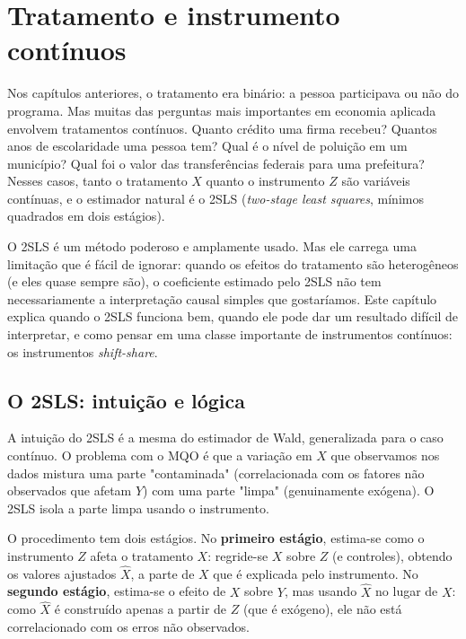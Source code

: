 
\chapter{Tratamento e instrumento contínuos}
\label{cap:iv_continuo}

Nos capítulos anteriores, o tratamento era binário: a pessoa participava ou não do programa. Mas muitas das perguntas mais importantes em economia aplicada envolvem tratamentos contínuos. Quanto crédito uma firma recebeu? Quantos anos de escolaridade uma pessoa tem? Qual é o nível de poluição em um município? Qual foi o valor das transferências federais para uma prefeitura? Nesses casos, tanto o tratamento $X$ quanto o instrumento $Z$ são variáveis contínuas, e o estimador natural é o 2SLS (\textit{two-stage least squares}, mínimos quadrados em dois estágios).

O 2SLS é um método poderoso e amplamente usado. Mas ele carrega uma limitação que é fácil de ignorar: quando os efeitos do tratamento são heterogêneos (e eles quase sempre são), o coeficiente estimado pelo 2SLS não tem necessariamente a interpretação causal simples que gostaríamos. Este capítulo explica quando o 2SLS funciona bem, quando ele pode dar um resultado difícil de interpretar, e como pensar em uma classe importante de instrumentos contínuos: os instrumentos \textit{shift-share}.

\section{O 2SLS: intuição e lógica}
\label{sec:2sls}

A intuição do 2SLS é a mesma do estimador de Wald, generalizada para o caso contínuo. O problema com o MQO é que a variação em $X$ que observamos nos dados mistura uma parte "contaminada" (correlacionada com os fatores não observados que afetam $Y$) com uma parte "limpa" (genuinamente exógena). O 2SLS isola a parte limpa usando o instrumento.

O procedimento tem dois estágios. No \textbf{primeiro estágio}, estima-se como o instrumento $Z$ afeta o tratamento $X$: regride-se $X$ sobre $Z$ (e controles), obtendo os valores ajustados $\widehat{X}$, a parte de $X$ que é explicada pelo instrumento. No \textbf{segundo estágio}, estima-se o efeito de $X$ sobre $Y$, mas usando $\widehat{X}$ no lugar de $X$: como $\widehat{X}$ é construído apenas a partir de $Z$ (que é exógeno), ele não está correlacionado com os erros não observados.

